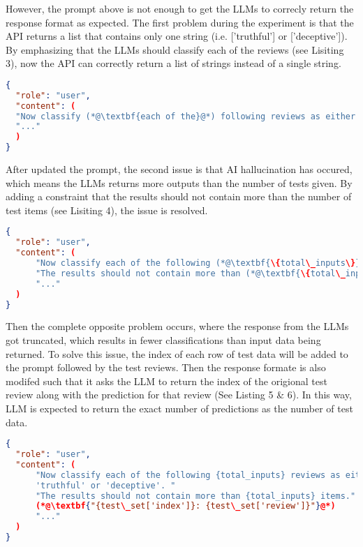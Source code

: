 \documentclass[sigconf, nonacm]{acmart}
\theoremstyle{definition}
\begin{document}
However, the prompt above is not enough to get the LLMs to correcly return the response format as expected. The first problem during the experiment is that the API returns a list that contains only one string (i.e. ['truthful'] or ['deceptive']). By emphasizing that the LLMs should classify each of the reviews (see Lisiting 3), now the API can correctly return a list of strings instead of a single string.

\begin{lstlisting}[language=json, caption={Updated User Messages 1}]
{
  "role": "user",
  "content": (
  "Now classify (*@\textbf{each of the}@*) following reviews as either 'truthful' or 'deceptive'. "
  "..."
  )
}
\end{lstlisting}

After updated the prompt, the second issue is that AI hallucination has occured, which means the LLMs returns more outputs than the number of tests given. By adding a constraint that the results should not contain more than the number of test items (see Lisiting 4), the issue is resolved.

\begin{lstlisting}[language=json, caption={Updated User Messages 2}]
{
  "role": "user",
  "content": (
      "Now classify each of the following (*@\textbf{\{total\_inputs\}}@*) reviews as either 'truthful' or 'deceptive'. "
      "The results should not contain more than (*@\textbf{\{total\_inputs\}}@*) items."
      "..."
  )
}
\end{lstlisting}

Then the complete opposite problem occurs, where the response from the LLMs got truncated, which results in fewer classifications than input data being returned. To solve this issue, the index of each row of test data will be added to the prompt followed by the test reviews. Then the response formate is also modifed such that it asks the LLM to return the index of the origional test review along with the prediction for that review (See Listing 5 \& 6). In this way, LLM is expected to return the exact number of predictions as the number of test data.

\begin{lstlisting}[language=json, caption={Updated User Messages 3}]
{
  "role": "user",
  "content": (
      "Now classify each of the following {total_inputs} reviews as either 
      'truthful' or 'deceptive'. "
      "The results should not contain more than {total_inputs} items."
      (*@\textbf{"{test\_set['index']}: {test\_set['review']}"}@*)
      "..."
  )
}
\end{lstlisting}
\end{document}
